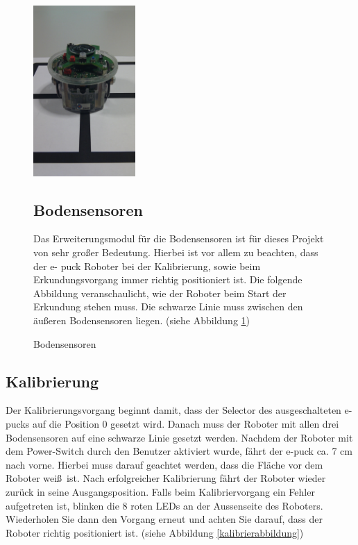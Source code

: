 \documentclass[10pt,a4paper]{article}
\begin{document}
    \begin{figure}[htbp]
		\begin{minipage}[t]{6.5cm}
			\vspace{0pt}
			\includegraphics[height=6.5cm]{images/puck2klein} 
			\caption{Bodensensoren}
			\label{positionierung_epuck}
		\end{minipage}
		\hfill
		\begin{minipage}[t]{0.5\textwidth}
			\vspace{10pt}
				\subsection{Bodensensoren}
						Das Erweiterungsmodul f\"ur die Bodensensoren ist f\"ur dieses Projekt von sehr gro\ss er Bedeutung. Hierbei ist vor allem zu beachten, dass der e-
						puck Roboter	bei der Kalibrierung, sowie beim Erkundungsvorgang immer richtig positioniert ist. Die folgende Abbildung veranschaulicht, wie der 
						Roboter beim Start der Erkundung stehen muss. Die schwarze Linie muss zwischen den \"au\ss eren Bodensensoren liegen. (siehe Abbildung 				
						\ref{positionierung_epuck})
		\end{minipage}
   \end{figure}
   
\newpage

	\subsection{Kalibrierung}
		Der Kalibrierungsvorgang beginnt damit, dass der Selector des ausgeschalteten e-pucks auf die Position 0 gesetzt wird. Danach muss der Roboter mit allen drei
		Bodensensoren auf eine schwarze Linie gesetzt werden. Nachdem der Roboter mit dem Power-Switch durch den Benutzer aktiviert wurde, f\"ahrt der e-puck ca.
		7 cm nach vorne. Hierbei muss darauf geachtet werden, dass die Fl\"ache vor dem Roboter wei\ss \ ist. Nach erfolgreicher Kalibrierung f\"ahrt der Roboter wieder
		zur\"uck in seine Ausgangsposition. Falls beim Kalibriervorgang ein Fehler aufgetreten ist, blinken die 8 roten LEDs an der Aussenseite des Roboters. 
		Wiederholen Sie dann den Vorgang erneut und achten Sie darauf, dass der Roboter richtig positioniert ist. (siehe Abbildung \ref{kalibrierabbildung}) \\
		
\end{document}
